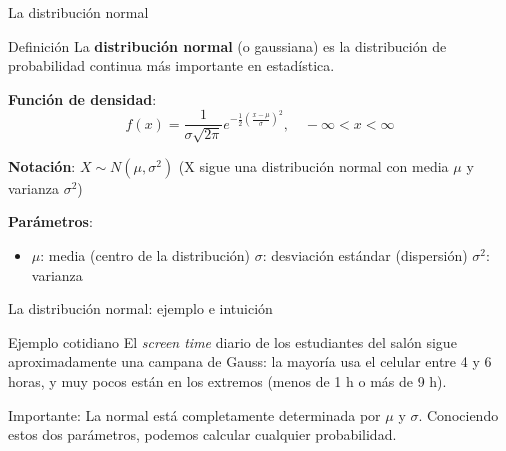 \documentclass[aspectratio=169, 11pt]{beamer}
\begin{document}
\begin{frame}{La distribuci\'on normal}
\begin{block}{Definici\'on}
La \textbf{distribuci\'on normal} (o gaussiana) es la distribuci\'on de probabilidad continua m\'as importante en estad\'istica.
\end{block}

\textbf{Funci\'on de densidad}:
\[
f(x) = \frac{1}{\sigma\sqrt{2\pi}} e^{-\frac{1}{2}\left(\frac{x-\mu}{\sigma}\right)^2}, \quad -\infty < x < \infty
\]

\textbf{Notaci\'on}: $X \sim N(\mu, \sigma^2)$ (X sigue una distribuci\'on normal con media $\mu$ y varianza $\sigma^2$)

\vspace{0.3em}
\textbf{Par\'ametros}:
\begin{itemize}
\item $\mu$: media (centro de la distribuci\'on) \quad $\sigma$: desviaci\'on est\'andar (dispersi\'on) \quad $\sigma^2$: varianza
\end{itemize}
\end{frame}

\begin{frame}{La distribuci\'on normal: ejemplo e intuici\'on}
\begin{exampleblock}{Ejemplo cotidiano}
El \emph{screen time} diario de los estudiantes del sal\'on sigue aproximadamente una campana de Gauss: la mayor\'ia usa el celular entre 4 y 6 horas, y muy pocos est\'an en los extremos (menos de 1 h o m\'as de 9 h).
\end{exampleblock}

\vspace{0.5em}
\alert{Importante}: La normal est\'a completamente determinada por $\mu$ y $\sigma$. Conociendo estos dos par\'ametros, podemos calcular cualquier probabilidad.
\end{frame}
\end{document}
